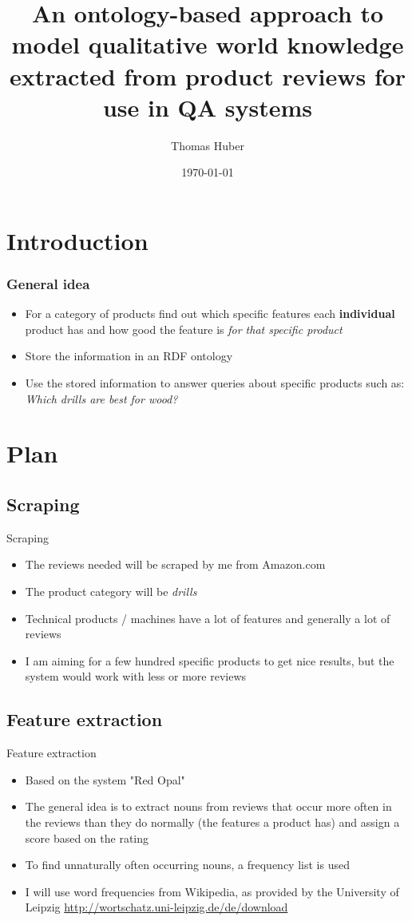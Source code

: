 \documentclass{beamer}
\title[Text Entailment Seminar] %
{An ontology-based approach to model qualitative world knowledge extracted from product reviews for use in QA systems}
\author[]{\Large Thomas Huber\texorpdfstring{\\ \small \vspace{1cm} \color{black}}{ }}
\date[\today] %
{\today}
\begin{document}
\frame{\titlepage}

\section{Introduction}
\begin{frame}
\frametitle{General idea}
\begin{itemize}
    \item For a category of products find out which specific features each \textbf{individual} product has and how good the feature is \textit{for that specific product}
	\item Store the information in an RDF ontology
    \item Use the stored information to answer queries about specific products such as: \textit{Which drills are best for wood?}
\end{itemize}
\end{frame}

\section{Plan}
\subsection{Scraping}
\begin{frame}{Scraping}
    \begin{itemize}
        \item The reviews needed will be scraped by me from Amazon.com
        \item The product category will be \textit{drills}
        \item Technical products / machines have a lot of features and generally a lot of reviews
        \item I am aiming for a few hundred specific products to get nice results, but the system would work with less or more reviews
    \end{itemize}
\end{frame}

\subsection{Feature extraction}
\begin{frame}{Feature extraction}
\begin{itemize}
    \item Based on the system "Red Opal"\\
        \cite{scaffidi2007red}
    \item The general idea is to extract nouns from reviews that occur more often in the reviews than they do normally (the features a product has) and assign a score based on the rating
    \item To find unnaturally often occurring nouns, a frequency list is used
    \item I will use word frequencies from Wikipedia, as provided by the University of Leipzig \url{http://wortschatz.uni-leipzig.de/de/download}
\end{itemize}
\end{frame}
\end{document}
